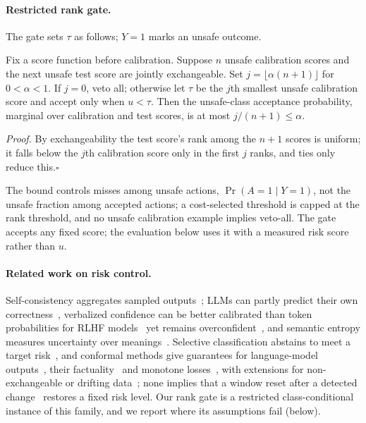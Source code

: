 \paragraph{Restricted rank gate.}
The gate sets $\tau$ as follows; $Y=1$ marks an unsafe outcome.
\begin{proposition}\label{prop:recal}
Fix a score function before calibration. Suppose $n$ unsafe calibration scores and the next unsafe test score are jointly exchangeable. Set $j=\lfloor\alpha(n+1)\rfloor$ for $0<\alpha<1$. If $j=0$, veto all; otherwise let $\tau$ be the $j$th smallest unsafe calibration score and accept only when $u<\tau$. Then the unsafe-class acceptance probability, marginal over calibration and test scores, is at most $j/(n+1)\le\alpha$.
\end{proposition}
\noindent\emph{Proof.} By exchangeability the test score's rank among the $n+1$ scores is uniform; it falls below the $j$th calibration score only in the first $j$ ranks, and ties only reduce this.\hfill$\square$

The bound controls misses among unsafe actions, $\Pr(A=1\mid Y=1)$, not the unsafe fraction among accepted actions; a cost-selected threshold is capped at the rank threshold, and no unsafe calibration example implies veto-all. The gate accepts any fixed score; the evaluation below uses it with a measured risk score rather than $u$.

\paragraph{Related work on risk control.}
Self-consistency aggregates sampled outputs~\cite{Wang2023SelfConsistency}; LLMs can partly predict their own correctness~\cite{Kadavath2022Know}, verbalized confidence can be better calibrated than token probabilities for RLHF models~\cite{Tian2023JustAsk} yet remains overconfident~\cite{Xiong2024ExpressUncertainty}, and semantic entropy measures uncertainty over meanings~\cite{Kuhn2023SemanticUncertainty}. Selective classification abstains to meet a target risk~\cite{Geifman2017Selective}, and conformal methods give guarantees for language-model outputs~\cite{Quach2024ConformalLM}, their factuality~\cite{Mohri2024ConformalFactuality} and monotone losses~\cite{Angelopoulos2024CRC}, with extensions for non-exchangeable or drifting data~\cite{Farinhas2024NCRC,Barber2023Beyond,Gibbs2021ACI}; none implies that a window reset after a detected change~\cite{Bifet2007ADWIN} restores a fixed risk level. Our rank gate is a restricted class-conditional instance of this family, and we report where its assumptions fail (below).

